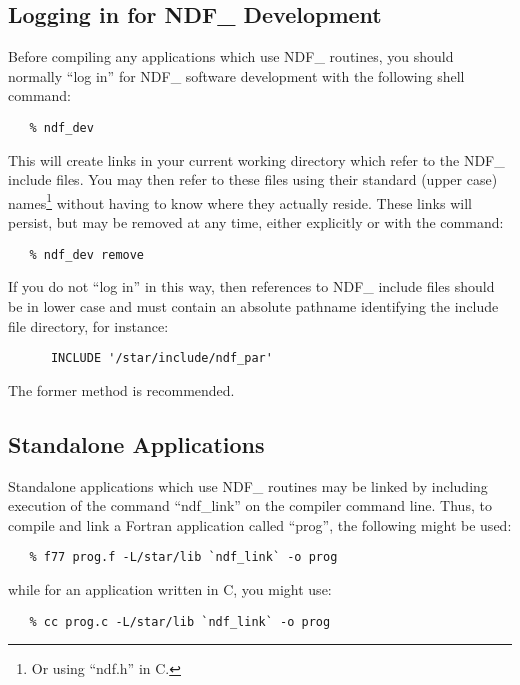 \subsection{Logging in for NDF\_ Development}

Before compiling any applications which use NDF\_ routines, you should
normally ``log in'' for NDF\_ software development with the following
shell command:

\small
\begin{verbatim}
   % ndf_dev
\end{verbatim}
\normalsize

This will create links in your current working directory which refer
to the NDF\_ include files. You may then refer to these files using
their standard (upper case) names\footnote{Or using ``ndf.h'' in C.}
without having to know where they actually reside. These links will
persist, but may be removed at any time, either explicitly or with the
command:

\small
\begin{verbatim}
   % ndf_dev remove
\end{verbatim}
\normalsize

If you do not ``log in'' in this way, then references to NDF\_ include
files should be in lower case and must contain an absolute pathname
identifying the include file directory, for instance:

\small
\begin{verbatim}
      INCLUDE '/star/include/ndf_par'
\end{verbatim}
\normalsize

The former method is recommended.

\subsection{Standalone Applications}
Standalone applications which use NDF\_ routines may be linked by
including execution of the command ``ndf\_link'' on the compiler
command line. Thus, to compile and link a Fortran application called
``prog'', the following might be used:

\small
\begin{verbatim}
   % f77 prog.f -L/star/lib `ndf_link` -o prog
\end{verbatim}
\normalsize

while for an application written in C, you might use:

\small
\begin{verbatim}
   % cc prog.c -L/star/lib `ndf_link` -o prog
\end{verbatim}
\normalsize

